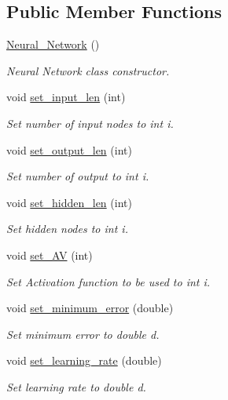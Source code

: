 \subsection*{Public Member Functions}
\begin{DoxyCompactItemize}
\item 
\hyperlink{a00003_a6f3defa930afbcb64a305393f741a2a4}{Neural\-\_\-\-Network} ()
\begin{DoxyCompactList}\small\item\em Neural Network class constructor. \end{DoxyCompactList}\item 
void \hyperlink{a00003_afb37f8321b35bbc9b9beb88d56d69f08}{set\-\_\-input\-\_\-len} (int)
\begin{DoxyCompactList}\small\item\em Set number of input nodes to int i. \end{DoxyCompactList}\item 
void \hyperlink{a00003_a695079279950a3eb27d62df68d32927c}{set\-\_\-output\-\_\-len} (int)
\begin{DoxyCompactList}\small\item\em Set number of output to int i. \end{DoxyCompactList}\item 
void \hyperlink{a00003_ad1e1afff306e47947e23f4fdd4517e22}{set\-\_\-hidden\-\_\-len} (int)
\begin{DoxyCompactList}\small\item\em Set hidden nodes to int i. \end{DoxyCompactList}\item 
void \hyperlink{a00003_a80b2c577da9fdc4e830722e7a4569069}{set\-\_\-\-A\-V} (int)
\begin{DoxyCompactList}\small\item\em Set Activation function to be used to int i. \end{DoxyCompactList}\item 
void \hyperlink{a00003_a0458bfedabe1b42e4d30e3179bd1f189}{set\-\_\-minimum\-\_\-error} (double)
\begin{DoxyCompactList}\small\item\em Set minimum error to double d. \end{DoxyCompactList}\item 
void \hyperlink{a00003_a87a3c876501fcd89ffc1caf298fa2703}{set\-\_\-learning\-\_\-rate} (double)
\begin{DoxyCompactList}\small\item\em Set learning rate to double d. \end{DoxyCompactList}\item 

\end{DoxyCompactItemize}
